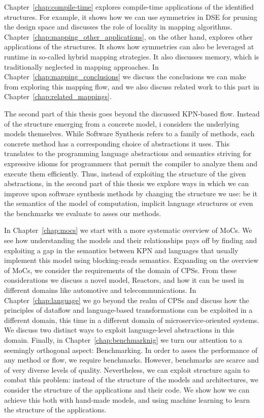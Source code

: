 Chapter~\ref{chap:compile-time} explores compile-time applications of the identified structures.
For example, it shows how we can use symmetries in \ac{DSE} for pruning the design space and discusses the role of locality in mapping algorithms.
Chapter~\ref{chap:mapping_other_applications}, on the other hand, explores other applications of the structures.
It shows how symmetries can also be leveraged at runtime in so-called hybrid mapping strategies.
It also discusses memory, which is traditionally neglected in mapping approaches.
In Chapter~\ref{chap:mapping_conclusions} we discuss the conclusions we can make from exploring this mapping flow,
and we also discuss related work to this part in Chapter~\ref{chap:related_mappings}.

The second part of this thesis goes beyond the discussed \ac{KPN}-based flow.
Instead of the structure emerging from a concrete model, i considers the underlying models themselves.
While Software Synthesis refers to a family of methods, each concrete method has a corresponding choice of abstractions it uses.
This translates to the programming language abstractions and semantics striving for expressive idioms for programmers that permit the compiler to analyze them and execute them efficiently.
Thus, instead of exploiting the structure of the given abstractions, in the second part of this thesis we explore ways in which we can improve upon software synthesis methods by changing the structure we use: be it the semantics of the model of computation, implicit language structures or even the benchmarks we evaluate to asses our methods.

In Chapter~\ref{chap:mocs} we start with a more systematic overview of \acfp{MoC}.
We see how understanding the models and their relationships pays off by finding and exploiting a gap in the semantics between \ac{KPN} and languages that usually implement this model using blocking-reads semantics.
Expanding on the overview of \acp{MoC}, we consider the requirements of the domain of \acp{CPS}.
From these considerations we discuss a novel model, Reactors, and how it can be used in different domains like automotive and telecommunications.
In Chapter~\ref{chap:language} we go beyond the realm of \acp{CPS} and discuss how the principles of dataflow and language-based transformations can be exploited in a different domain, this time in a different domain of microservice-oriented systems. We discuss two distinct ways to exploit language-level abstractions in this domain.
Finally, in Chapter~\ref{chap:benchmarknig} we turn our attention to a seemingly orthogonal aspect: Benchmarking.
In order to asses the performance of any method or flow, we require benchmarks.
However, benchmarks are scarce and of very diverse levels of quality.
Nevertheless, we can exploit structure again to combat this problem: instead of the structure of the models and architectures, we consider the structure of the applications and their code.
We show how we can achieve this both with hand-made models, and using machine learning to learn the structure of the applications.

